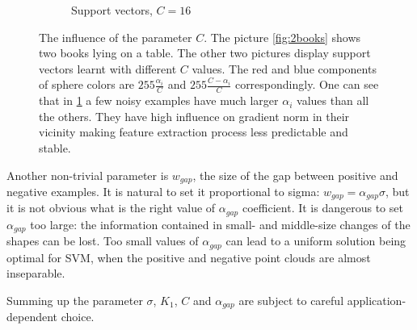 \begin{figure}
\begin{subfigure}[b]{0.3\textwidth}
                \caption{Support vectors, $C=16$}
                \label{fig:2books16}
        \end{subfigure}
\caption{The influence of the parameter $C$. The picture \ref{fig:2books} shows two books lying on a table. The other two pictures display support vectors learnt with different $C$ values. The red and blue components of sphere colors are $255 \frac{\alpha_i}{C}$ and $255\frac{C - \alpha_i}{C}$ correspondingly. One can see that in \ref{fig:2books16} a few noisy examples have much larger $\alpha_i$ values than all the others. They have high influence on gradient norm in their vicinity making feature extraction process less predictable and stable.} 
\label{fig:sv}
\end{figure}

Another non-trivial parameter is $w_{gap}$, the size of the gap between positive and negative examples. It is natural to set it proportional to sigma: $w_{gap} = \alpha_{gap} \sigma$, but it is not obvious what is the right value of $\alpha_{gap}$ coefficient. It is dangerous to set $\alpha_{gap}$ too large: the information contained in small- and middle-size changes of the shapes can be lost. Too small values of $\alpha_{gap}$ can lead to a uniform solution being optimal for SVM, when the positive and negative point clouds are almost inseparable. 

Summing up the parameter $\sigma$, $K_1$, $C$ and $\alpha_{gap}$ are subject to careful application-dependent choice. 

